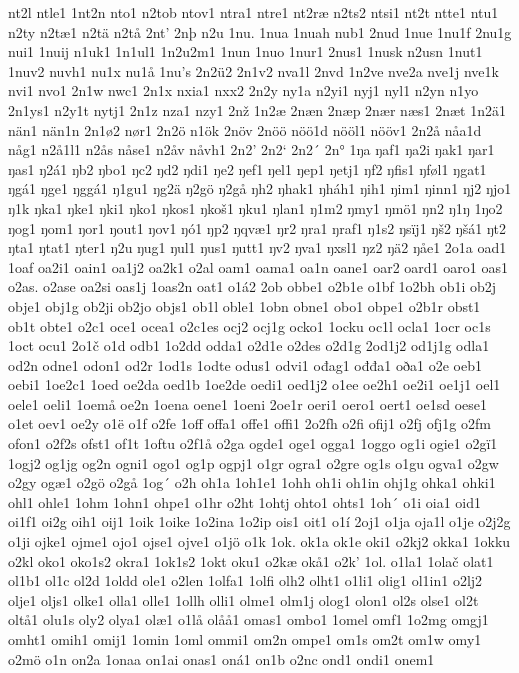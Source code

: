 nt2l
ntle1
1nt2n
nto1
n2tob
ntov1
ntra1
ntre1
nt2ræ
n2ts2
ntsi1
nt2t
ntte1
ntu1
n2ty
n2tæ1
n2tä
n2tå
2nt'
2nþ
n2u
1nu.
1nua
1nuah
nub1
2nud
1nue
1nu1f
2nu1g
nui1
1nuij
n1uk1
1n1ul1
1n2u2m1
1nun
1nuo
1nur1
2nus1
1nusk
n2usn
1nut1
1nuv2
nuvh1
nu1x
nu1å
1nu's
2n2ü2
2n1v2
nva1l
2nvd
1n2ve
nve2a
nve1j
nve1k
nvi1
nvo1
2n1w
nwc1
2n1x
nxia1
nxx2
2n2y
ny1a
n2yi1
nyj1
nyl1
n2yn
n1yo
2n1ys1
n2y1t
nytj1
2n1z
nza1
nzy1
2nž
1n2æ
2næn
2næp
2nær
næs1
2næt
1n2ä1
nän1
nän1n
2n1ø2
nør1
2n2ö
n1ök
2növ
2nöö
nöö1d
nööl1
nööv1
2n2å
nåa1d
någ1
n2å1l1
n2ås
nåse1
n2åv
nåvh1
2n2'
2n2`
2n2´
2n°
1ŋa
ŋaf1
ŋa2i
ŋak1
ŋar1
ŋas1
ŋ2á1
ŋb2
ŋbo1
ŋc2
ŋd2
ŋdi1
ŋe2
ŋef1
ŋel1
ŋep1
ŋetj1
ŋf2
ŋfis1
ŋføl1
ŋgat1
ŋgá1
ŋge1
ŋggá1
ŋ1gu1
ŋg2ä
ŋ2gö
ŋ2gå
ŋh2
ŋhak1
ŋháh1
ŋih1
ŋim1
ŋinn1
ŋj2
ŋjo1
ŋ1k
ŋka1
ŋke1
ŋki1
ŋko1
ŋkos1
ŋkoš1
ŋku1
ŋlan1
ŋ1m2
ŋmy1
ŋmö1
ŋn2
ŋ1ŋ
1ŋo2
ŋog1
ŋom1
ŋor1
ŋout1
ŋov1
ŋó1
ŋp2
ŋqvæ1
ŋr2
ŋra1
ŋraf1
ŋ1s2
ŋsïj1
ŋš2
ŋšá1
ŋt2
ŋta1
ŋtat1
ŋter1
ŋ2u
ŋug1
ŋul1
ŋus1
ŋutt1
ŋv2
ŋva1
ŋxsl1
ŋz2
ŋä2
ŋåe1
2o1a
oad1
1oaf
oa2i1
oain1
oa1j2
oa2k1
o2al
oam1
oama1
oa1n
oane1
oar2
oard1
oaro1
oas1
o2as.
o2ase
oa2si
oas1j
1oas2n
oat1
o1á2
2ob
obbe1
o2b1e
o1bf
1o2bh
ob1i
ob2j
obje1
obj1g
ob2ji
ob2jo
objs1
ob1l
oble1
1obn
obne1
obo1
obpe1
o2b1r
obst1
ob1t
obte1
o2c1
oce1
ocea1
o2c1es
ocj2
ocj1g
ocko1
1ocku
oc1l
ocla1
1ocr
oc1s
1oct
ocu1
2o1č
o1d
odb1
1o2dd
odda1
o2d1e
o2des
o2d1g
2od1j2
od1j1g
odla1
od2n
odne1
odon1
od2r
1od1s
1odte
odus1
odvi1
ođag1
ođđa1
oða1
o2e
oeb1
oebi1
1oe2c1
1oed
oe2da
oed1b
1oe2de
oedi1
oed1j2
o1ee
oe2h1
oe2i1
oe1j1
oel1
oele1
oeli1
1oemå
oe2n
1oena
oene1
1oeni
2oe1r
oeri1
oero1
oert1
oe1sd
oese1
o1et
oev1
oe2y
o1ë
o1f
o2fe
1off
offa1
offe1
offi1
2o2fh
o2fi
ofij1
o2fj
ofj1g
o2fm
ofon1
o2f2s
ofst1
of1t
1oftu
o2f1å
o2ga
ogde1
oge1
ogga1
1oggo
og1i
ogie1
o2gï1
1ogj2
og1jg
og2n
ogni1
ogo1
og1p
ogpj1
o1gr
ogra1
o2gre
og1s
o1gu
ogva1
o2gw
o2gy
ogæ1
o2gö
o2gå
1og´
o2h
oh1a
1oh1e1
1ohh
oh1i
oh1in
ohj1g
ohka1
ohki1
ohl1
ohle1
1ohm
1ohn1
ohpe1
o1hr
o2ht
1ohtj
ohto1
ohts1
1oh´
o1i
oia1
oid1
oi1f1
oi2g
oih1
oij1
1oik
1oike
1o2ina
1o2ip
ois1
oit1
o1í
2oj1
o1ja
oja1l
o1je
o2j2g
o1ji
ojke1
ojme1
ojo1
ojse1
ojve1
o1jö
o1k
1ok.
ok1a
ok1e
oki1
o2kj2
okka1
1okku
o2kl
oko1
oko1s2
okra1
1ok1s2
1okt
oku1
o2kæ
okå1
o2k'
1ol.
o1la1
1olač
olat1
ol1b1
ol1c
ol2d
1oldd
ole1
o2len
1olfa1
1olfi
olh2
olht1
o1li1
olig1
ol1in1
o2lj2
olje1
oljs1
olke1
olla1
olle1
1ollh
olli1
olme1
olm1j
olog1
olon1
ol2s
olse1
ol2t
oltå1
olu1s
oly2
olya1
olæ1
o1lå
olåå1
omas1
ombo1
1omel
omf1
1o2mg
omgj1
omht1
omih1
omij1
1omin
1oml
ommi1
om2n
ompe1
om1s
om2t
om1w
omy1
o2mö
o1n
on2a
1onaa
on1ai
onas1
oná1
on1b
o2nc
ond1
ondi1
onem1
